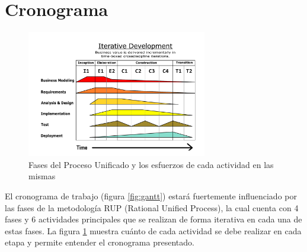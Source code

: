 \section{Cronograma}

\begin{figure}[!ht]
    \centering
    \includegraphics[width=0.7\textwidth]{assets/rupphases}
    \caption{Fases del Proceso Unificado y los esfuerzos de cada actividad en las mismas}
    \label{fig:rupphases}
\end{figure}

El cronograma de trabajo (figura \ref{fig:gantt}) estará fuertemente influenciado por las fases de la metodología RUP (Rational Unified Process), la cual cuenta con 4 fases y 6 actividades principales que se realizan de forma iterativa en cada una de estas fases. La figura \ref{fig:rupphases} muestra cuánto de cada actividad se debe realizar en cada etapa y permite entender el cronograma presentado.

